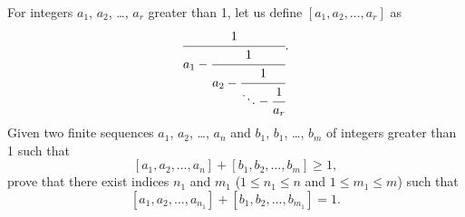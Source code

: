 \problem{}
For integers $a_1$, $a_2$, \ldots, $a_r$ greater than 1, let us define
$[a_1, a_2, \ldots, a_r]$ as
\[
    \cfrac{1}{
        a_1 - \cfrac{1}{
            a_2 - \cfrac{1}{
                \ddots - \cfrac{1}{a_r} } } }
.\]
Given two finite sequences
$a_1$, $a_2$, \ldots, $a_n$ and $b_1$, $b_1$, \ldots, $b_m$
of integers greater than 1 such that
\[
    [a_1, a_2, \ldots, a_n] + [b_1, b_2, \ldots, b_m] \geq 1
,\]
prove that there exist indices $n_1$ and $m_1$ 
($1 \leq n_1 \leq n$ and $1 \leq m_1 \leq m$)
such that
\[
    [a_1, a_2, \ldots, a_{n_1}] + [b_1, b_2, \ldots, b_{m_1}] = 1
.\]

\solution

\endproblem
